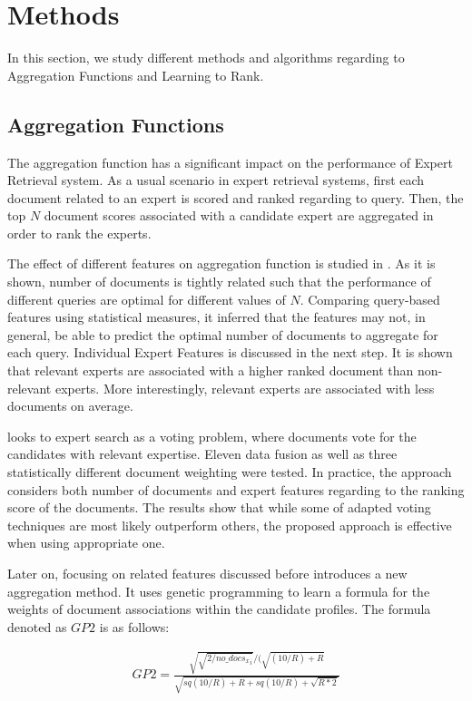 \section{Methods}
\label{sec:methods}
In this section, we study different methods and algorithms regarding to Aggregation Functions and Learning to Rank.

\subsection{Aggregation Functions}
The aggregation function has a significant impact on the performance of Expert Retrieval system. As a usual scenario in expert retrieval systems, first each document related to an expert is scored and ranked regarding to query. Then, the top $N$ document scores associated with a candidate expert are aggregated in order to rank the experts. 

The effect of different features on aggregation function is studied in \citet{agg-gp2}. As it is shown, number of documents is tightly related such that the performance of different queries are optimal for different values of $N$. Comparing query-based features using statistical measures, it inferred that the features may not, in general, be able to predict the optimal number of documents to aggregate for each query. Individual Expert Features is discussed in the next step. It is shown that relevant experts are associated with a higher ranked document than non-relevant experts. More interestingly, relevant experts are associated with less documents on average.

\citet{agg-vote} looks to expert search as a voting problem, where documents vote for the candidates with relevant expertise. Eleven data fusion as well as three statistically different document weighting were tested. In practice, the approach considers both number of documents and expert features regarding to the ranking score of the documents. The results show that while some of adapted voting techniques are most likely outperform others, the proposed approach is effective when using appropriate one.

Later on, focusing on related features discussed before \citet{agg-gp2} introduces a new aggregation method. It uses genetic programming to learn a formula for the weights of document associations within the candidate profiles. The formula denoted as $GP2$ is as follows:

\begin{align*}
GP2 = \frac{\sqrt{\sqrt{2/{no\_docs_x}_i}}/(\sqrt{(10/R)+R}}{\sqrt{sq(10/R)+R+sq(10/R)+\sqrt{R*2}}}
\end{align*}

